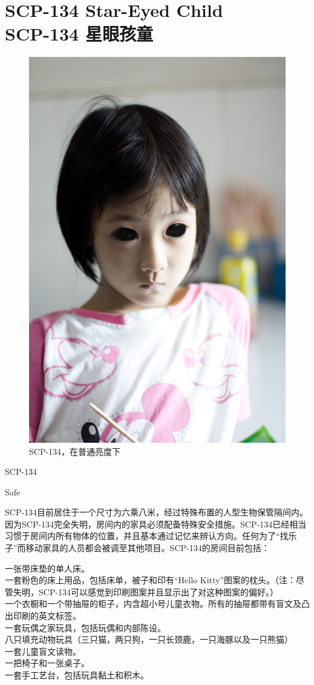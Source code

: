 \chapter[SCP-134 星眼孩童]{
    SCP-134 Star-Eyed Child\\
    SCP-134 星眼孩童
}

\label{chap:SCP-134}

\begin{figure}[H]
    \centering
    \includegraphics[width=0.5\linewidth]{images/SCP-134.jpg}
    \caption*{SCP-134，在普通亮度下}
\end{figure}

SCP-134

Safe

SCP-134目前居住于一个尺寸为六乘八米，经过特殊布置的人型生物保管隔间内。因为SCP-134完全失明，房间内的家具必须配备特殊安全措施。SCP-134已经相当习惯于房间内所有物体的位置，并且基本通过记忆来辨认方向。任何为了“找乐子”而移动家具的人员都会被调至其他项目。SCP-134的房间目前包括：

一张带床垫的单人床。\\
一套粉色的床上用品，包括床单，被子和印有“Hello Kitty”图案的枕头。（注：尽管失明，SCP-134可以感觉到印刷图案并且显示出了对这种图案的偏好。）\\
一个衣橱和一个带抽屉的柜子，内含超小号儿童衣物。所有的抽屉都带有盲文及凸出印刷的英文标签。\\
一套玩偶之家玩具，包括玩偶和内部陈设。\\
八只填充动物玩具（三只猫，两只狗，一只长颈鹿，一只海豚以及一只熊猫）\\
一套儿童盲文读物。\\
一把椅子和一张桌子。\\
一套手工艺台，包括玩具黏土和积木。


